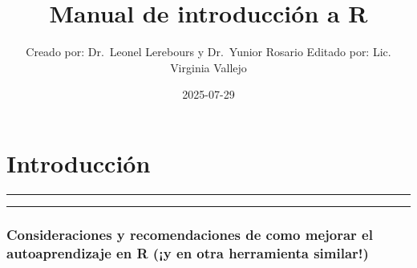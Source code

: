 \documentclass[
  letterpaper,
  DIV=11,
  numbers=noendperiod]{scrreprt}
\title{Manual de introducción a R}
\author{Creado por: Dr.~Leonel Lerebours y Dr.~Yunior Rosario Editado
por: Lic. Virginia Vallejo}
\date{2025-07-29}
\renewcommand*\contentsname{Contenido}
\newcommand\contentsname{Contenido}
\begin{document}
\maketitle

\renewcommand*\contentsname{Contenido}
{
\hypersetup{linkcolor=}
\setcounter{tocdepth}{2}
\tableofcontents
}


\chapter{Introducción}\label{introducciuxf3n}

\begin{center}\rule{0.5\linewidth}{0.5pt}\end{center}

\begin{center}\rule{0.5\linewidth}{0.5pt}\end{center}

\subsection{Consideraciones y recomendaciones de como mejorar el
autoaprendizaje en R (¡y en otra herramienta
similar!)}\label{consideraciones-y-recomendaciones-de-como-mejorar-el-autoaprendizaje-en-r-y-en-otra-herramienta-similar}
\end{document}
